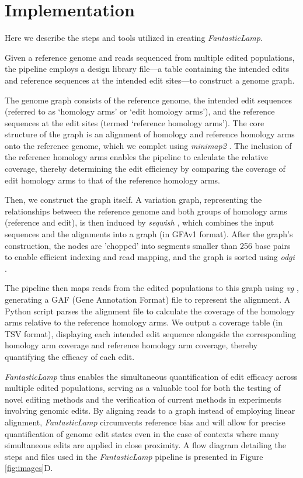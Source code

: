 \documentclass{bioinfo}
\theoremstyle{definition}
\begin{document}
\section*{Implementation}
\label{sec:implementation}
Here we describe the steps and tools utilized in creating \textit{FantasticLamp}.

Given a reference genome and reads sequenced from multiple edited populations, the pipeline employs a design library file---a table containing the intended edits and reference sequences at the intended edit sites---to construct a genome graph.

The genome graph consists of the reference genome, the intended edit sequences (referred to as `homology arms' or `edit homology arms'), and the reference sequences at the edit sites (termed `reference homology arms').
The core structure of the graph is an alignment of homology and reference homology arms onto the reference genome, which we complet using \textit{minimap2} \citep{li2018minimap2}.
The inclusion of the reference homology arms enables the pipeline to calculate the relative coverage, thereby determining the edit efficiency by comparing the coverage of edit homology arms to that of the reference homology arms.

Then, we construct the graph itself.
A variation graph, representing the relationships between the reference genome and both groups of homology arms (reference and edit), is then induced by \textit{seqwish} \citep{garrison2023unbiased}, which combines the input sequences and the alignments into a graph (in GFAv1 format).
After the graph's construction, the nodes are 'chopped' into segments smaller than 256 base pairs to enable efficient indexing and read mapping, and the graph is sorted using \textit{odgi} \citep{guarracino2022odgi}.

The pipeline then maps reads from the edited populations to this graph using \textit{vg} \citep{garrison2018variation}, generating a GAF (Gene Annotation Format) file to represent the alignment.
A Python script parses the alignment file to calculate the coverage of the homology arms relative to the reference homology arms.
We output a coverage table (in TSV format), displaying each intended edit sequence alongside the corresponding homology arm coverage and reference homology arm coverage, thereby quantifying the efficacy of each edit.

\textit{FantasticLamp} thus enables the simultaneous quantification of edit efficacy across multiple edited populations, serving as a valuable tool for both the testing of novel editing methods and the verification of current methods in experiments involving genomic edits.
By aligning reads to a graph instead of employing linear alignment, \textit{FantasticLamp} circumvents reference bias and will allow for precise quantification of genome edit states even in the case of contexts where many simultaneous edits are applied in close proximity.
A flow diagram detailing the steps and files used in the \textit{FantasticLamp} pipeline is presented in Figure \ref{fig:images}D.
\end{document}
